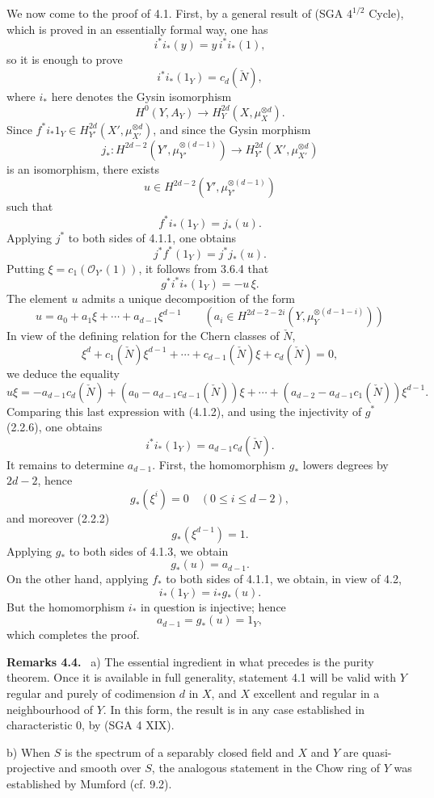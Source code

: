 \documentclass[11pt]{article}
\newenvironment{statement}[1]{\par\medskip\noindent\textbf{#1.}\ }{\par\medskip}
\begin{document}
We now come to the proof of 4.1. First, by a general result of (SGA $4^{1/2}$ Cycle), which is proved in an essentially formal way, one has
\[
i^*i_*(y)=y\,i^*i_*(1),
\]
so it is enough to prove
\[
i^*i_*(1_Y)=c_d(\check N),
\]
where $i_*$ here denotes the Gysin isomorphism
\[
H^0(Y,A_Y)\to H_Y^{2d}(X,\mu_X^{\otimes d}).
\]
Since $f^*i_*1_Y\in H_{Y'}^{2d}(X',\mu_{X'}^{\otimes d})$, and since the Gysin morphism
\[
j_*:H^{2d-2}(Y',\mu_{Y'}^{\otimes(d-1)})
\to H_{Y'}^{2d}(X',\mu_{X'}^{\otimes d})
\]
is an isomorphism, there exists
\[
u\in H^{2d-2}(Y',\mu_{Y'}^{\otimes(d-1)})
\]
such that
\[
f^*i_*(1_Y)=j_*(u).
\tag{4.1.1}
\]
Applying $j^*$ to both sides of 4.1.1, one obtains
\[
j^*f^*(1_Y)=j^*j_*(u).
\]
Putting $\xi=c_1(\mathcal O_{Y'}(1))$, it follows from 3.6.4 that
\[
g^*i^*i_*(1_Y)=-u\,\xi.
\tag{4.1.2}
\]
The element $u$ admits a unique decomposition of the form
\[
u=a_0+a_1\xi+\cdots+a_{d-1}\xi^{d-1}
\qquad
(a_i\in H^{2d-2-2i}(Y,\mu_Y^{\otimes(d-1-i)}))
\tag{4.1.3}
\]
In view of the defining relation for the Chern classes of $\check N$,
\[
\xi^d+c_1(\check N)\xi^{d-1}+\cdots+c_{d-1}(\check N)\xi+c_d(\check N)=0,
\tag{4.1.4}
\]
we deduce the equality
\[
u\xi=-a_{d-1}c_d(\check N)+(a_0-a_{d-1}c_{d-1}(\check N))\xi
+\cdots+(a_{d-2}-a_{d-1}c_1(\check N))\xi^{d-1}.
\]
Comparing this last expression with (4.1.2), and using the injectivity of $g^*$ (2.2.6), one obtains
\[
i^*i_*(1_Y)=a_{d-1}c_d(\check N).
\tag{4.1.5}
\]
It remains to determine $a_{d-1}$. First, the homomorphism $g_*$ lowers degrees by $2d-2$, hence
\[
g_*(\xi^i)=0\quad(0\le i\le d-2),
\]
and moreover (2.2.2)
\[
g_*(\xi^{d-1})=1.
\]
Applying $g_*$ to both sides of 4.1.3, we obtain
\[
g_*(u)=a_{d-1}.
\tag{4.1.6}
\]
On the other hand, applying $f_*$ to both sides of 4.1.1, we obtain, in view of 4.2,
\[
i_*(1_Y)=i_*g_*(u).
\tag{4.1.7}
\]
But the homomorphism $i_*$ in question is injective; hence
\[
a_{d-1}=g_*(u)=1_Y,
\]
which completes the proof.

\begin{statement}{Remarks 4.4}
a) The essential ingredient in what precedes is the purity theorem. Once it is available in full generality, statement 4.1 will be valid with $Y$ regular and purely of codimension $d$ in $X$, and $X$ excellent and regular in a neighbourhood of $Y$. In this form, the result is in any case established in characteristic $0$, by (SGA 4 XIX).

b) When $S$ is the spectrum of a separably closed field and $X$ and $Y$ are quasi-projective and smooth over $S$, the analogous statement in the Chow ring of $Y$ was established by Mumford (cf. 9.2).
\end{statement}
\end{document}
